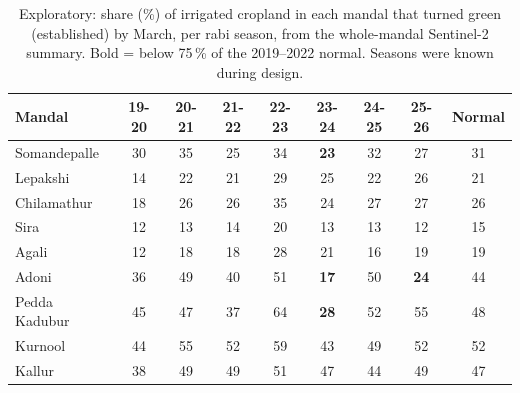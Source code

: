 \begin{table}[H]
\centering
\caption{Exploratory: share (\%) of irrigated cropland in each mandal that turned green (established) by March, per rabi season, from the whole-mandal Sentinel-2 summary. Bold = below 75\,\% of the 2019--2022 normal. Seasons were known during design.}
\label{tab:r_c3}
\footnotesize
\begin{tabular}{@{}lcccccccc@{}}
\toprule
\textbf{Mandal} & \textbf{19-20} & \textbf{20-21} & \textbf{21-22} & \textbf{22-23} & \textbf{23-24} & \textbf{24-25} & \textbf{25-26} & \textbf{Normal} \\
\midrule
Somandepalle & 30 & 35 & 25 & 34 & \textbf{23} & 32 & 27 & 31 \\
Lepakshi & 14 & 22 & 21 & 29 & 25 & 22 & 26 & 21 \\
Chilamathur & 18 & 26 & 26 & 35 & 24 & 27 & 27 & 26 \\
Sira & 12 & 13 & 14 & 20 & 13 & 13 & 12 & 15 \\
Agali & 12 & 18 & 18 & 28 & 21 & 16 & 19 & 19 \\
Adoni & 36 & 49 & 40 & 51 & \textbf{17} & 50 & \textbf{24} & 44 \\
Pedda Kadubur & 45 & 47 & 37 & 64 & \textbf{28} & 52 & 55 & 48 \\
Kurnool & 44 & 55 & 52 & 59 & 43 & 49 & 52 & 52 \\
Kallur & 38 & 49 & 49 & 51 & 47 & 44 & 49 & 47 \\
\bottomrule
\end{tabular}
\end{table}
